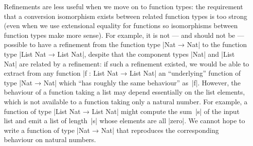 Refinements are less useful when we move on to function types: the requirement that a conversion isomorphism exists between related function types is too strong (even when we use extensional equality for functions so isomorphisms between function types make more sense).
For example, it is not --- and should not be --- possible to have a refinement from the function type |Nat → Nat| to the function type |List Nat → List Nat|, despite that the component types |Nat| and |List Nat| are related by a refinement: if such a refinement existed, we would be able to extract from any function |f : List Nat → List Nat| an ``underlying'' function of type |Nat → Nat| which ``has roughly the same behaviour'' as~|f|.
However, the behaviour of a function taking a list may depend essentially on the list elements, which is not available to a function taking only a natural number.
For example, a function of type |List Nat → List Nat| might compute the sum~|s| of the input list and emit a list of length~|s| whose elements are all |zero|.
We cannot hope to write a function of type |Nat → Nat| that reproduces the corresponding behaviour on natural numbers.


